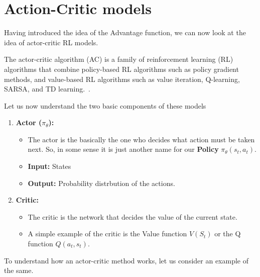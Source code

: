 \section{Action-Critic models}
Having introduced the idea of the Advantage function, we can now look at the idea of actor-critic RL models. \\
\begin{tcolorbox}[title = Actor-critic model]
    The actor-critic algorithm (AC) is a family of reinforcement learning (RL) algorithms that combine policy-based RL algorithms such as policy gradient methods, and value-based RL algorithms such as value iteration, Q-learning, SARSA, and TD learning.~\cite{wiki:Actor-critic_algorithm}.
\end{tcolorbox}
Let us now understand the two basic components of these models
\begin{enumerate}
    \item \textbf{Actor ($\pi_{\theta}$):} 
    \begin{itemize}
        \item The actor is the basically the one who decides what action must be taken next. So, in some sense it is just another name for our \textbf{Policy} $\pi_{\theta}(s_t,a_t)$.
        \item \textbf{Input:} States 
        \item \textbf{Output:} Probability distrbution of the actions.
    \end{itemize}
    \item \textbf{Critic:} 
    \begin{itemize}
        \item The critic is the network that decides the value of the current state.
        \item A simple example of the critic is the Value function $V(S_t)$ or the Q function $Q(a_t,s_t)$. 
    \end{itemize}
\end{enumerate}
To understand how an actor-critic method works, let us consider an example of the same. 
